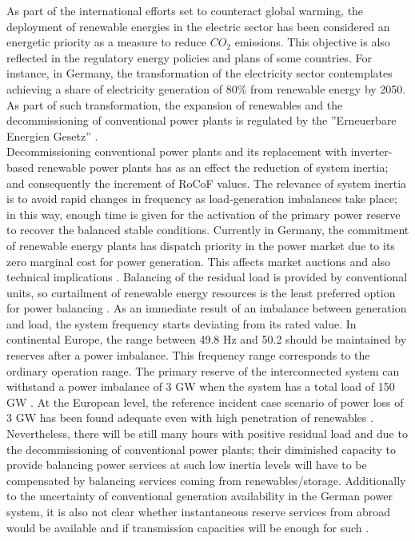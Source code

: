 As part of the international efforts set to counteract global warming, the deployment of renewable energies in the electric sector has been considered an energetic priority as a measure to reduce $CO_{2}$ emissions. This objective is also reflected in the regulatory energy policies and plans of some countries. For instance, in Germany, the transformation of the electricity sector contemplates achieving a share of electricity generation of 80\% from renewable energy by 2050. As part of such transformation, the expansion of renewables and the decommissioning of conventional power plants is regulated by the ''Erneuerbare Energien Gesetz” \cite{AgoraEnergiewende.}.\\

Decommissioning conventional power plants and its replacement with inverter-based renewable power plants has as an effect the reduction of system inertia; and consequently the increment of RoCoF values. The relevance of system inertia is to avoid rapid changes in frequency as load-generation imbalances take place; in this way, enough time is given for the activation of the primary power reserve to recover the balanced stable conditions. Currently in Germany, the commitment of renewable energy plants has dispatch priority in the power market due to its zero marginal cost for power generation. This affects market auctions and also technical implications \cite{energiewende2017flexibility}. Balancing of the residual load is provided by conventional units, so curtailment of renewable energy resources is the least preferred option for power balancing \cite{dena2014}. As an immediate result of an imbalance between generation and load, the system frequency starts deviating from its rated value. In continental Europe, the range between 49.8 Hz and 50.2 should be maintained by reserves after a power imbalance. This frequency range corresponds to the ordinary operation range. The primary reserve of the interconnected system can withstand a power imbalance of 3 GW when the system has a total load of 150 GW \cite{ENTSOE.2016}. At the European level, the reference incident case scenario of power loss of 3 GW has been found adequate even with high penetration of renewables \cite{ENTSOE.2016, dena2014}. Nevertheless, there will be still many hours with positive residual load and due to the decommissioning of conventional power plants; their diminished capacity to provide balancing power services at such low inertia levels will have to be compensated by balancing services coming from renewables/storage. Additionally to the uncertainty of conventional generation availability in the German power system, it is also not clear whether instantaneous reserve services from abroad would be available and if transmission capacities will be enough for such \cite{dena2014}.\\


